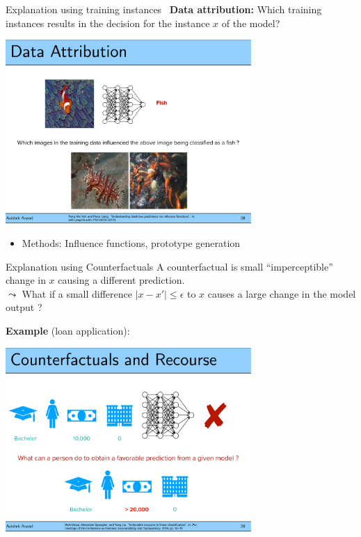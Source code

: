 \documentclass[11pt,compress,t,notes=noshow, aspectratio=169, xcolor=table]{beamer}
\begin{document}
\begin{frame}{Explanation using training instances~}
	\textbf{Data attribution:} Which training instances results in the decision for the instance $x$ of the model?
	\begin{center}
		\includegraphics[page=1, width=0.7\textwidth]{figure/prototypes-fish.pdf}
	\end{center}
	\begin{itemize}
		\item Methods:
		Influence functions, prototype generation
	\end{itemize}
\end{frame}

\begin{frame}{Explanation using Counterfactuals}
    A counterfactual is small ``imperceptible'' change in $x$ causing a different prediction.\\
    $\leadsto$ What if a small difference $ |x - x'| \leq \epsilon$ to $x$ causes a large change in the model output ?
    
    \textbf{Example} (loan application):
	\begin{center}
	\includegraphics[page=1, width=0.7\textwidth]{figure/counterfactual.pdf}
	\end{center}

\end{frame}
\end{document}
